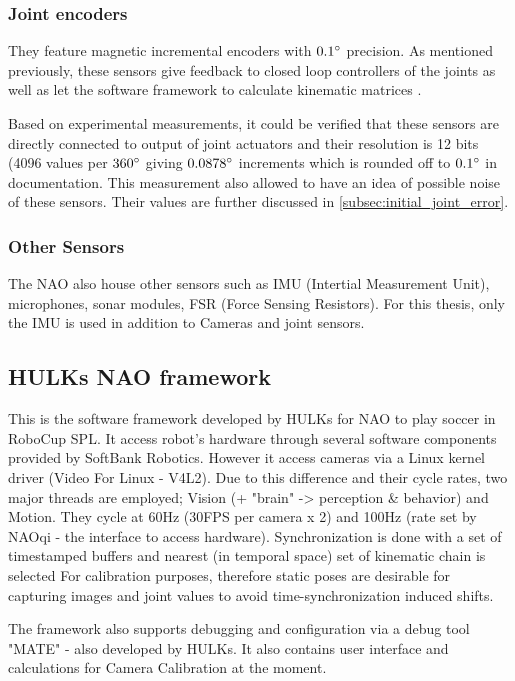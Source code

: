 \documentclass[english, printversion, nomenclature, notitle]{tuvisionthesis} %
\begin{document}
\subsubsection{Joint encoders}
\label{subsub:jointEncoders}

They feature magnetic incremental encoders with $0.1\degree$ precision. As mentioned previously, these sensors give feedback to closed loop controllers of the joints as well as let the software framework to calculate kinematic matrices \cite{softbank_robotics_joint_nodate}.

Based on experimental measurements, it could be verified that these sensors are directly connected to output of joint actuators and their resolution is 12 bits (4096 values per $360\degree$ giving $0.0878\degree$ increments which is rounded off to $0.1\degree$ in documentation. This measurement also allowed to have an idea of possible noise of these sensors. Their values are further discussed in \cref{subsec:initial_joint_error}.

\subsubsection{Other Sensors}
The NAO also house other sensors such as IMU (Intertial Measurement Unit), microphones, sonar modules, FSR (Force Sensing Resistors). For this thesis, only the IMU is used in addition to Cameras and joint sensors.

\subsection{HULKs NAO framework}
This is the software framework developed by HULKs for NAO to play soccer in RoboCup SPL. It access robot's hardware through several software components provided by SoftBank Robotics. However it access cameras via a Linux kernel driver (Video For Linux - V4L2). Due to this difference and their cycle rates, two major threads are employed; Vision (+ "brain" -> perception \& behavior)  and Motion. They cycle at 60Hz (30FPS per camera x 2) and 100Hz (rate set by NAOqi - the interface to access hardware). Synchronization is done with a set of timestamped buffers and nearest (in temporal space) set of kinematic chain is selected For calibration purposes, therefore static poses are desirable for capturing images and joint values to avoid time-synchronization induced shifts.

The framework also supports debugging and configuration via a debug tool "MATE" - also developed by HULKs. It also contains user interface and calculations for Camera Calibration at the moment.
\end{document}
